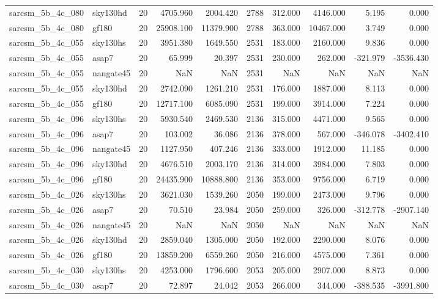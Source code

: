 \begin{longtable}{llrrrrrrrr}
sarcsm\_5b\_4c\_080 & sky130hd & 20 & 4705.960 & 2004.420 & 2788 & 312.000 & 4146.000 & 5.195 & 0.000 \\
sarcsm\_5b\_4c\_080 & gf180 & 20 & 25908.100 & 11379.900 & 2788 & 363.000 & 10467.000 & 3.749 & 0.000 \\
sarcsm\_5b\_4c\_055 & sky130hs & 20 & 3951.380 & 1649.550 & 2531 & 183.000 & 2160.000 & 9.836 & 0.000 \\
sarcsm\_5b\_4c\_055 & asap7 & 20 & 65.999 & 20.397 & 2531 & 230.000 & 262.000 & -321.979 & -3536.430 \\
sarcsm\_5b\_4c\_055 & nangate45 & 20 & NaN & NaN & 2531 & NaN & NaN & NaN & NaN \\
sarcsm\_5b\_4c\_055 & sky130hd & 20 & 2742.090 & 1261.210 & 2531 & 176.000 & 1887.000 & 8.113 & 0.000 \\
sarcsm\_5b\_4c\_055 & gf180 & 20 & 12717.100 & 6085.090 & 2531 & 199.000 & 3914.000 & 7.224 & 0.000 \\
sarcsm\_5b\_4c\_096 & sky130hs & 20 & 5930.540 & 2469.530 & 2136 & 315.000 & 4471.000 & 9.565 & 0.000 \\
sarcsm\_5b\_4c\_096 & asap7 & 20 & 103.002 & 36.086 & 2136 & 378.000 & 567.000 & -346.078 & -3402.410 \\
sarcsm\_5b\_4c\_096 & nangate45 & 20 & 1127.950 & 407.246 & 2136 & 333.000 & 1912.000 & 11.185 & 0.000 \\
sarcsm\_5b\_4c\_096 & sky130hd & 20 & 4676.510 & 2003.170 & 2136 & 314.000 & 3984.000 & 7.803 & 0.000 \\
sarcsm\_5b\_4c\_096 & gf180 & 20 & 24435.900 & 10888.800 & 2136 & 353.000 & 9756.000 & 6.719 & 0.000 \\
sarcsm\_5b\_4c\_026 & sky130hs & 20 & 3621.030 & 1539.260 & 2050 & 199.000 & 2473.000 & 9.796 & 0.000 \\
sarcsm\_5b\_4c\_026 & asap7 & 20 & 70.510 & 23.984 & 2050 & 259.000 & 326.000 & -312.778 & -2907.140 \\
sarcsm\_5b\_4c\_026 & nangate45 & 20 & NaN & NaN & 2050 & NaN & NaN & NaN & NaN \\
sarcsm\_5b\_4c\_026 & sky130hd & 20 & 2859.040 & 1305.000 & 2050 & 192.000 & 2290.000 & 8.076 & 0.000 \\
sarcsm\_5b\_4c\_026 & gf180 & 20 & 13859.200 & 6559.260 & 2050 & 216.000 & 4575.000 & 7.361 & 0.000 \\
sarcsm\_5b\_4c\_030 & sky130hs & 20 & 4253.000 & 1796.600 & 2053 & 205.000 & 2907.000 & 8.873 & 0.000 \\
sarcsm\_5b\_4c\_030 & asap7 & 20 & 72.897 & 24.042 & 2053 & 266.000 & 344.000 & -388.535 & -3991.800 \\

\end{longtable}
